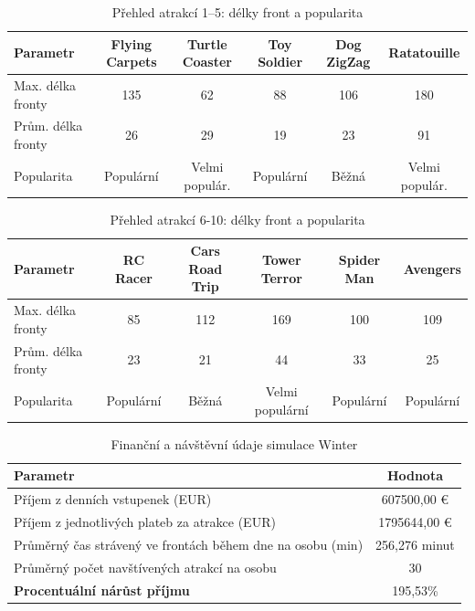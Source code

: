 \documentclass[a4paper,12pt]{article}
\begin{document}
\begin{table}[h!]
	\centering
	\caption{Přehled atrakcí 1–5: délky front a popularita}
	\label{tab:attractions_overview_1_5}
	\begin{tabular}{|l|c|c|c|c|c|}
		\hline
		\textbf{Parametr}&\textbf{Flying Carpets}&\textbf{Turtle Coaster}&\textbf{Toy Soldier}&\textbf{Dog ZigZag}&\textbf{Ratatouille}\\ \hline
		Max. délka fronty   &135                 & 62                & 88                 & 106                 & 180     \\ \hline
		Prům. délka fronty  &26                 & 29                & 19                 & 23                 & 91         \\ \hline
		Popularita          &Populární         &Velmi populár.        &Populární          & Běžná          &Velmi populár.\\ \hline
	\end{tabular}
\end{table}
\begin{table}[h!]
	\centering
	\caption{Přehled atrakcí 6-10: délky front a popularita}
	\label{tab:attractions_overview_6_10}
	\begin{tabular}{|l|c|c|c|c|c|}
		\hline
		\textbf{Parametr}   & \textbf{RC  Racer}& \textbf{Cars Road Trip}& \textbf{Tower Terror}& \textbf{Spider Man}& \textbf{Avengers}\\ \hline
		Max. délka fronty   & 85                 & 112                & 169                 & 100               & 109               \\ \hline
		Prům. délka fronty  & 23                & 21                 & 44                & 33                 & 25               \\ \hline
		Popularita          & Populární             & Běžná              & Velmi populární        & Populární          & Populární   \\ \hline
	\end{tabular}
\end{table}

\begin{table}[h!]
	\centering
	\caption{Finanční a návštěvní údaje simulace Winter}
	\label{tab:financial_and_visit_data}
	\begin{tabular}{|l|c|}
		\hline
		\textbf{Parametr}                                         & \textbf{Hodnota} \\ \hline
		Příjem z denních vstupenek (EUR)                          & 607500,00 €   \\ \hline
		Příjem z jednotlivých plateb za atrakce (EUR)             & 1795644,00 €   \\ \hline
		Průměrný čas strávený ve frontách během dne na osobu (min) & 256,276 minut     \\ \hline
		Průměrný počet navštívených atrakcí na osobu             & 30               \\ \hline
		\textbf{Procentuální nárůst příjmu}                       & 195,53\%         \\ \hline
	\end{tabular}
\end{table}
\end{document}
